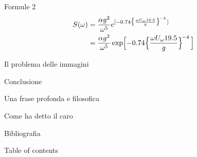 \documentclass{beamer}
\begin{document}
\begin{frame}{Formule 2}
    \begin{align*}
        S(\omega) 
        &= \frac{\alpha g^2}{\omega^5} e^{[ -0.74\bigl\{\frac{\omega U_\omega         19.5}{g}\bigr\}^{\!-4}\,]} \\
        &= \frac{\alpha g^2}{\omega^5} \exp\Bigl[ -0.74\Bigl\{\frac{\omega       U_\omega 19.5}{g}\Bigr\}^{\!-4}\,\Bigr] 
    \end{align*}
\end{frame}


\begin{frame}{Il problema delle immagini}
\end{frame}

\begin{frame}{Conclusione}
    \begin{alertblock}{Una frase profonda e filosofica}
        \lipsum[66]
    \end{alertblock}
\end{frame}

\begin{frame}
	\nocite{CF} Come ha detto il caro \cite{RAM} \newline
	\pause
\end{frame}

\begin{frame}{Bibliografia}
	\printbibliography[heading=none]
\end{frame}

\begin{frame}{Table of contents}
	\tableofcontents
\end{frame}
\end{document}
